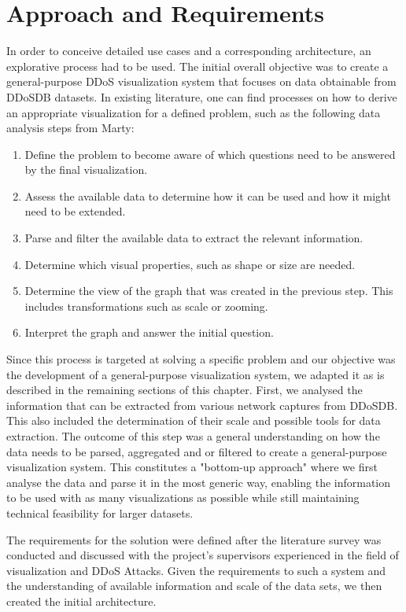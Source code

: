 
\chapter{Approach and Requirements}
In order to conceive detailed use cases and a corresponding architecture, an explorative process had to be used. The initial overall objective was to create a general-purpose DDoS visualization system that focuses on data obtainable from DDoSDB datasets. In existing literature, one can find processes on how to derive an appropriate visualization for a defined problem, such as the following data analysis steps from Marty\cite{appliedsecurityvisualization}:
\begin{enumerate}
    \item Define the problem to become aware of which questions need to be answered by the final visualization.
    \item Assess the available data to determine how it can be used and how it might need to be extended.
    \item Parse and filter the available data to extract the relevant information.
    \item Determine which visual properties, such as shape or size are needed.
    \item Determine the view of the graph that was created in the previous step. This includes transformations such as scale or zooming.
    \item Interpret the graph and answer the initial question.
\end{enumerate}

Since this process is targeted at solving a specific problem and our objective was the development of a general-purpose visualization system, we adapted it as is described in the remaining sections of this chapter. First, we analysed the information that can be extracted from various network captures from DDoSDB. This also included the determination of their scale and possible tools for data extraction. The outcome of this step was a general understanding on how the data needs to be parsed, aggregated and or filtered to create a general-purpose visualization system. This constitutes a "bottom-up approach" where we first analyse the data and parse it in the most generic way,  enabling the information to be used with as many visualizations as possible while still maintaining technical feasibility for larger datasets.

The requirements for the solution were defined after the literature survey was conducted and discussed with the project's supervisors experienced in the field of visualization and DDoS Attacks.
Given the requirements to such a system and the understanding of available information and scale of the data sets, we then created the initial architecture.

